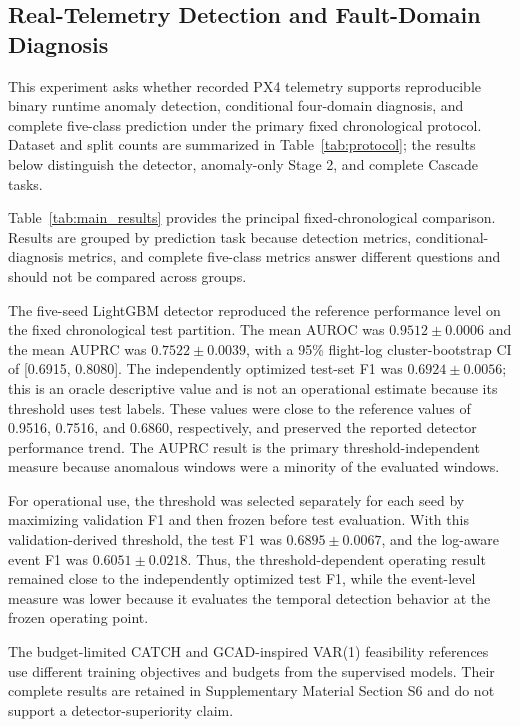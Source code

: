 \subsection{Real-Telemetry Detection and Fault-Domain Diagnosis}
\label{sec:real_telemetry_results}

This experiment asks whether recorded PX4 telemetry supports reproducible binary runtime anomaly detection, conditional four-domain diagnosis, and complete five-class prediction under the primary fixed chronological protocol. Dataset and split counts are summarized in Table~\ref{tab:protocol}; the results below distinguish the detector, anomaly-only Stage 2, and complete Cascade tasks.

Table~\ref{tab:main_results} provides the principal fixed-chronological comparison. Results are grouped by prediction task because detection metrics, conditional-diagnosis metrics, and complete five-class metrics answer different questions and should not be compared across groups.



The five-seed LightGBM detector reproduced the reference performance level on the fixed chronological test partition. The mean AUROC was $0.9512 \pm 0.0006$ and the mean AUPRC was $0.7522 \pm 0.0039$, with a 95\% flight-log cluster-bootstrap CI of [0.6915, 0.8080]. The independently optimized test-set F1 was $0.6924 \pm 0.0056$; this is an oracle descriptive value and is not an operational estimate because its threshold uses test labels. These values were close to the reference values of 0.9516, 0.7516, and 0.6860, respectively, and preserved the reported detector performance trend. The AUPRC result is the primary threshold-independent measure because anomalous windows were a minority of the evaluated windows.

For operational use, the threshold was selected separately for each seed by maximizing validation F1 and then frozen before test evaluation. With this validation-derived threshold, the test F1 was $0.6895 \pm 0.0067$, and the log-aware event F1 was $0.6051 \pm 0.0218$. Thus, the threshold-dependent operating result remained close to the independently optimized test F1, while the event-level measure was lower because it evaluates the temporal detection behavior at the frozen operating point.

The budget-limited CATCH and GCAD-inspired VAR(1) feasibility references use different training objectives and budgets from the supervised models. Their complete results are retained in Supplementary Material Section S6 and do not support a detector-superiority claim.


